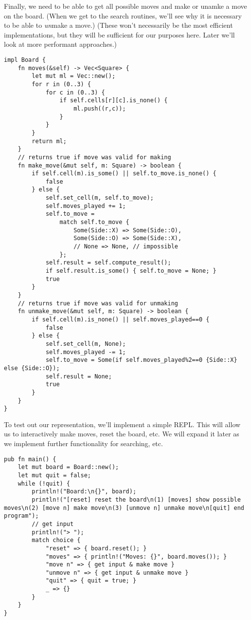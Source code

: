 \documentclass[10pt,dvipdfmx]{report}
\begin{document}
Finally, we need to be able to get all possible moves and make or unamke a move on the board.
(When we get to the search routines, we'll see why it is necessary to be able to {\em un}make a move.)
(These won't necessarily be the most efficient implementations, but they will be sufficient for our
purposes here.  Later we'll look at more performant approaches.)
{\scriptsize\begin{verbatim}
impl Board {
    fn moves(&self) -> Vec<Square> {
        let mut ml = Vec::new();
        for r in (0..3) {
            for c in (0..3) {
                if self.cells[r][c].is_none() {
                    ml.push((r,c));
                }
            }
        }
        return ml;
    }
    // returns true if move was valid for making
    fn make_move(&mut self, m: Square) -> boolean {
        if self.cell(m).is_some() || self.to_move.is_none() {
            false
        } else {
            self.set_cell(m, self.to_move);
            self.moves_played += 1;
            self.to_move =
                match self.to_move {
                    Some(Side::X) => Some(Side::O),
                    Some(Side::O) => Some(Side::X),
                    // None => None, // impossible
                };
            self.result = self.compute_result();
            if self.result.is_some() { self.to_move = None; }
            true
        }
    }
    // returns true if move was valid for unmaking
    fn unmake_move(&mut self, m: Square) -> boolean {
        if self.cell(m).is_none() || self.moves_played==0 {
            false
        } else {
            self.set_cell(m, None);
            self.moves_played -= 1;
            self.to_move = Some(if self.moves_played%2==0 {Side::X} else {Side::O});
            self.result = None;
            true
        }
    }
}
\end{verbatim}}


To test out our representation, we'll implement a simple REPL.
This will allow us to interactively make moves, reset the board, etc.
We will expand it later as we implement further functionality for searching, etc.

{\scriptsize\begin{verbatim}
pub fn main() {
    let mut board = Board::new();
    let mut quit = false;
    while (!quit) {
        println!("Board:\n{}", board);
        println!("[reset] reset the board\n(1) [moves] show possible moves\n(2) [move n] make move\n(3) [unmove n] unmake move\n[quit] end program");
        // get input
        println!("> ");
        match choice {
            "reset" => { board.reset(); }
            "moves" => { println!("Moves: {}", board.moves()); }
            "move n" => { get input & make move }
            "unmove n" => { get input & unmake move }
            "quit" => { quit = true; }
            _ => {}
        }
    }
}
\end{verbatim}}
\end{document}
